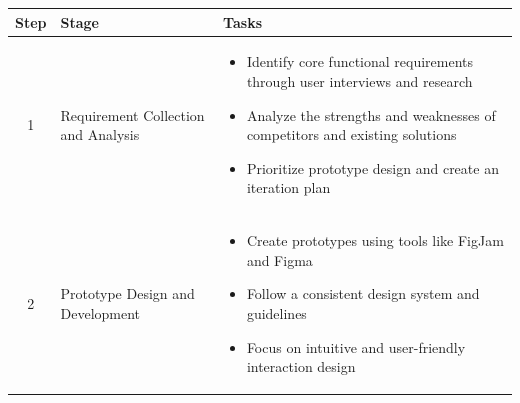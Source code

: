 \begin{table}[h!]
    \centering
    \renewcommand{\arraystretch}{1.5}
    \begin{tabular}{|c|p{4cm}|p{10cm}|}
    \hline
    \textbf{Step} & \textbf{Stage}           & \textbf{Tasks}
    \\ \hline
    1             & Requirement Collection and Analysis & \begin{itemize}
                                                            \item Identify core
                                                            functional
                                                            requirements through
                                                            user interviews and
                                                            research
                                                            \item Analyze the
                                                            strengths and
                                                            weaknesses of
                                                            competitors and
                                                            existing solutions
                                                            \item Prioritize
                                                        prototype design and
                                                        create an iteration plan
                                                        \end{itemize}
                                                        \\ \hline
    2             & Prototype Design and Development & \begin{itemize}
                                                        \item Create prototypes
                                                        using tools like FigJam
                                                        and Figma
                                                        \item Follow a
                                                        consistent design system
                                                        and guidelines
                                                        \item Focus on intuitive
                                                    and user-friendly
                                                    interaction design

\end{itemize}
\end{tabular}
\end{table}
